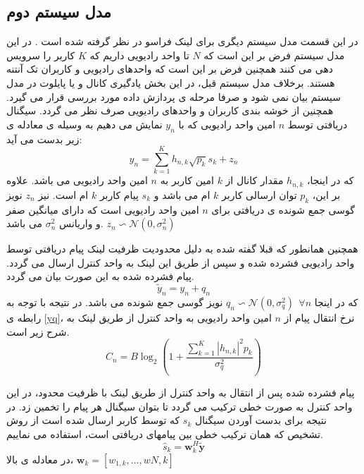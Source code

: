  \subsection{مدل سیستم دوم}
 در این قسمت مدل سیستم دیگری برای لینک فراسو در نظر گرفته شده است \cite{ofdma,ulCompression,dlulP}.
 در این مدل سیستم فرض بر این است که 
 $N$
 تا واحد رادیویی داریم که $K$ کاربر را سرویس دهی می کنند همچنین فرض بر این است که واحدهای رادیویی و کاربران تک آنتنه هستند. برخلاف مدل سیستم قبل، در این بخش یادگیری کانال و یا پایلوت در مدل سیستم بیان نمی شود و صرفا مرحله ی پردازش داده مورد بررسی قرار می گیرد. همچنین از خوشه بندی کاربران و واحدهای رادیویی صرف نظر می گردد.
 سیگنال دریافتی توسط $n$ امین واحد رادیویی که با $y_n$  نمایش می دهیم به وسیله ی معادله ی زیر بدست می آید:
 \begin{equation}
 y_n = \sum_{k=1}^{K} h_{n,k} \sqrt{p_k} s_k + z_n
 \end{equation}
 که در اینجا، $h_{n,k}$ مقدار کانال از $k$ امین کاربر به $n$ امین واحد رادیویی می باشد. علاوه بر این، $p_k$ توان ارسالی کاربر $k$ ام می باشد و $s_k$ پیام کاربر $k$ ام است. نیز $z_n$ نویز گوسی جمع شونده ی دریافتی برای $n$ امین واحد رادیویی است که دارای میانگین صفر و واریانس $\sigma_n^2$ می باشد.
 $z_n \backsim \mathcal{N}(0,\sigma_n^2)$ 

همچنین همانطور که قبلا گفته شده به دلیل محدودیت ظرفیت لینک  پیام دریافتی توسط واحد رادیویی فشرده شده و سپس از طریق این لینک به واحد کنترل ارسال می گردد.
پیام فشرده شده به این صورت بیان می گردد.
\begin{equation}\label{yq}
\tilde{y}_n = y_n + q_n
\end{equation} 
که در اینجا
 $q_n \backsim \mathcal{N}(0,\sigma_q^2) \ \ \forall n$ 
 نویز گوسی جمع شونده می باشد.
 در نتیجه با توجه به رابطه ی \eqref{yq}، نرخ انتقال پیام از $n$ امین واحد رادیویی به واحد کنترل از طریق لینک  به شرح زیر است.
 \begin{equation}
 C_n = B \log_2 (1+ \frac{\sum_{k=1}^{K} |h_{n,k}|^2 p_k}{\sigma_q^2})
 \end{equation}
 
پیام فشرده شده پس از انتقال به واحد کنترل از طریق لینک با ظرفیت محدود، در این واحد کنترل به صورت خطی ترکیب می گردد تا بتوان سیگنال هر پیام را تخمین زد.
در نتیجه برای بدست آوردن سیگنال $s_k$ که توسط کاربر ارسال شده است از روش تشخیص  که همان ترکیب خطی بین پیامهای دریافتی است، استفاده می نماییم.
\begin{equation}\label{sk}
\hat{s}_k = \boldsymbol{w}_k^H \tilde{\boldsymbol{y}}
\end{equation}
در معادله ی بالا،
 $\boldsymbol{w}_k = [w_{1,k},...,w{N,k}]$
 
